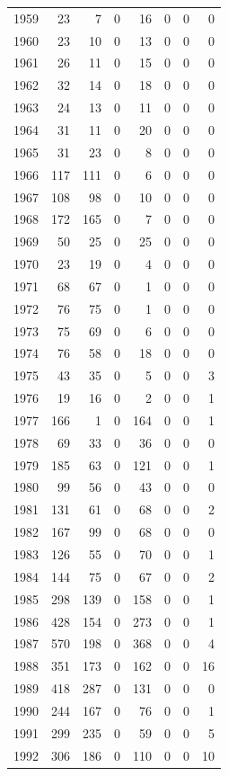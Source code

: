 \documentclass[
]{scrartcl}
\begin{document}
\begin{longtable}[t]{rrrrrrrr}
1959 & 23 & 7 & 0 & 16 & 0 & 0 & 0\\
1960 & 23 & 10 & 0 & 13 & 0 & 0 & 0\\
1961 & 26 & 11 & 0 & 15 & 0 & 0 & 0\\
1962 & 32 & 14 & 0 & 18 & 0 & 0 & 0\\
1963 & 24 & 13 & 0 & 11 & 0 & 0 & 0\\
1964 & 31 & 11 & 0 & 20 & 0 & 0 & 0\\
1965 & 31 & 23 & 0 & 8 & 0 & 0 & 0\\
1966 & 117 & 111 & 0 & 6 & 0 & 0 & 0\\
1967 & 108 & 98 & 0 & 10 & 0 & 0 & 0\\
1968 & 172 & 165 & 0 & 7 & 0 & 0 & 0\\
1969 & 50 & 25 & 0 & 25 & 0 & 0 & 0\\
1970 & 23 & 19 & 0 & 4 & 0 & 0 & 0\\
1971 & 68 & 67 & 0 & 1 & 0 & 0 & 0\\
1972 & 76 & 75 & 0 & 1 & 0 & 0 & 0\\
1973 & 75 & 69 & 0 & 6 & 0 & 0 & 0\\
1974 & 76 & 58 & 0 & 18 & 0 & 0 & 0\\
1975 & 43 & 35 & 0 & 5 & 0 & 0 & 3\\
1976 & 19 & 16 & 0 & 2 & 0 & 0 & 1\\
1977 & 166 & 1 & 0 & 164 & 0 & 0 & 1\\
1978 & 69 & 33 & 0 & 36 & 0 & 0 & 0\\
1979 & 185 & 63 & 0 & 121 & 0 & 0 & 1\\
1980 & 99 & 56 & 0 & 43 & 0 & 0 & 0\\
1981 & 131 & 61 & 0 & 68 & 0 & 0 & 2\\
1982 & 167 & 99 & 0 & 68 & 0 & 0 & 0\\
1983 & 126 & 55 & 0 & 70 & 0 & 0 & 1\\
1984 & 144 & 75 & 0 & 67 & 0 & 0 & 2\\
1985 & 298 & 139 & 0 & 158 & 0 & 0 & 1\\
1986 & 428 & 154 & 0 & 273 & 0 & 0 & 1\\
1987 & 570 & 198 & 0 & 368 & 0 & 0 & 4\\
1988 & 351 & 173 & 0 & 162 & 0 & 0 & 16\\
1989 & 418 & 287 & 0 & 131 & 0 & 0 & 0\\
1990 & 244 & 167 & 0 & 76 & 0 & 0 & 1\\
1991 & 299 & 235 & 0 & 59 & 0 & 0 & 5\\
1992 & 306 & 186 & 0 & 110 & 0 & 0 & 10\\

\end{longtable}
\end{document}
